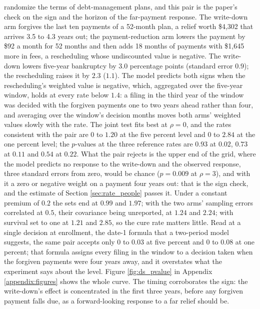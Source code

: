 \citet{dobbie_targeted_2020} randomize the terms of debt-management plans, and this pair is the paper's check on the sign and the horizon of the far-payment response. The write-down arm forgives the last ten payments of a 52-month plan, a relief worth \$4,302 that arrives 3.5 to 4.3 years out; the payment-reduction arm lowers the payment by \$92 a month for 52 months and then adds 18 months of payments with \$1,645 more in fees, a rescheduling whose undiscounted value is negative. The write-down lowers five-year bankruptcy by $3.0$ percentage points (standard error $0.9$); the rescheduling raises it by $2.3$ ($1.1$). The model predicts both signs when the rescheduling's weighted value is negative, which, aggregated over the five-year window, holds at every rate below $1.4$: a filing in the third year of the window was decided with the forgiven payments one to two years ahead rather than four, and averaging over the window's decision months moves both arms' weighted values slowly with the rate. The joint test fits best at $\rho = 0$, and the rates consistent with the pair are $0$ to $1.20$ at the five percent level and $0$ to $2.84$ at the one percent level; the $p$-values at the three reference rates are $0.93$ at $0.02$, $0.73$ at $0.11$ and $0.54$ at $0.22$. What the pair rejects is the upper end of the grid, where the model predicts no response to the write-down and the observed response, three standard errors from zero, would be chance ($p = 0.009$ at $\rho = 3$), and with it a zero or negative weight on a payment four years out: that is the sign check, and the estimate of Section \ref{sec:rate_people} passes it. Under a constant premium of $0.2$ the sets end at $0.99$ and $1.97$; with the two arms' sampling errors correlated at $0.5$, their covariance being unreported, at $1.24$ and $2.24$; with survival set to one at $1.21$ and $2.85$, so the cure rate matters little. Read at a single decision at enrollment, the date-1 formula that a two-period model suggests, the same pair accepts only $0$ to $0.03$ at five percent and $0$ to $0.08$ at one percent; that formula assigns every filing in the window to a decision taken when the forgiven payments were four years away, and it overstates what the experiment says about the level. Figure \ref{fig:ds_pvalue} in Appendix \ref{appendix:figures} shows the whole curve. The timing corroborates the sign: the write-down's effect is concentrated in the first three years, before any forgiven payment falls due, as a forward-looking response to a far relief should be.

